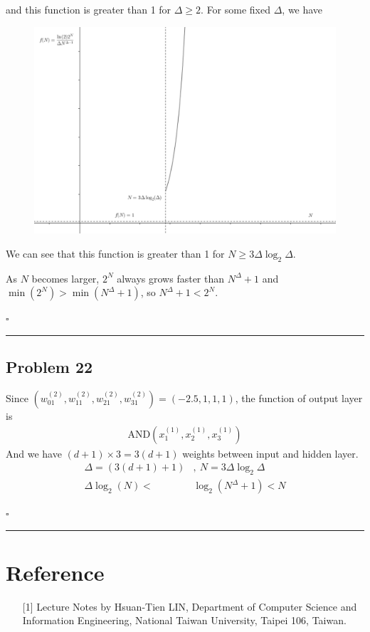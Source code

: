 \documentclass[12pt]{article}
\newcommand*{\QEDB}{\hfill\ensuremath{\square}}
\newcommand{\ParTh}[1]{\left(#1\right)}
\newcommand{\horrule}[1]{\rule{\linewidth}{#1}}
\begin{document}
and this function is greater than 1 for $\Delta\geq2$. For some fixed $\Delta$, we have
\begin{figure}[H]
	\centering
	\includegraphics[scale=0.4]{21-2.png}
\end{figure}
We can see that this function is greater than 1 for $N\geq3\Delta\log_2\Delta$.

As $N$ becomes larger, $2^N$ always grows faster than $N^{\Delta}+1$ and $\min\ParTh{2^N}>\min\ParTh{N^\Delta+1}$, so $N^\Delta+1<2^N$.

\QEDB

\horrule{0.5pt}

\subsection*{Problem 22}

Since $\ParTh{w^{\ParTh{2}}_{01},w^{\ParTh{2}}_{11},w^{\ParTh{2}}_{21},w^{\ParTh{2}}_{31}}=\ParTh{-2.5,1,1,1}$, the function of output layer is
\begin{align}
\text{AND}\ParTh{x^{\ParTh{1}}_1,x^{\ParTh{1}}_2,x^{\ParTh{1}}_3}
\end{align}
And we have $\ParTh{d+1}\times3=3\ParTh{d+1}$ weights between input and hidden layer.
\begin{align}
\Delta=\ParTh{3\ParTh{d+1}+1}&,~N=3\Delta\log_2\Delta\\
\Delta\log_2\ParTh{N}<&\log_2\ParTh{N^\Delta+1}<N
\end{align}

\QEDB

\horrule{0.5pt}

\section*{Reference}

\begin{enumerate}

\item[{[1]}] Lecture Notes by Hsuan-Tien LIN, Department of Computer Science and Information Engineering, National Taiwan University, Taipei 106, Taiwan.

\end{enumerate}
\end{document}
